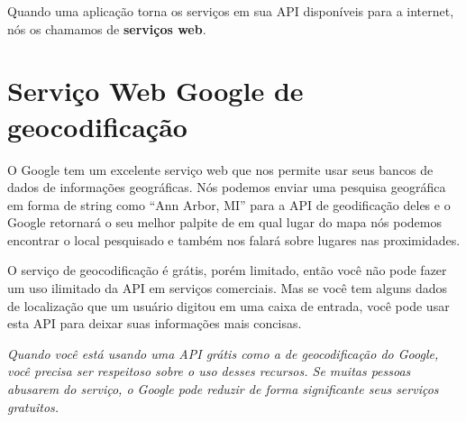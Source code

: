 Quando uma aplicação torna os serviços em sua API disponíveis para a internet,
nós os chamamos de {\bf serviços web}.

\section{Serviço Web Google de geocodificação}

O Google tem um excelente serviço web que nos permite usar seus bancos de
dados de informações geográficas. Nós podemos enviar uma pesquisa geográfica 
em forma de string como ``Ann Arbor, MI'' para a API de geodificação deles e o 
Google retornará o seu melhor palpite de em qual lugar do mapa nós podemos 
encontrar o local pesquisado e também nos falará sobre lugares nas proximidades. 

O serviço de geocodificação é grátis, porém limitado, então você não pode fazer
um uso ilimitado da API em serviços comerciais. Mas se você tem alguns dados de
localização que um usuário digitou em uma caixa de entrada, você pode usar
esta API para deixar suas informações mais concisas.

{\em Quando você está usando uma API grátis como a de geocodificação do Google,
você precisa ser respeitoso sobre o uso desses recursos. Se muitas pessoas
abusarem do serviço, o Google pode reduzir de forma significante seus serviços
gratuitos.}

